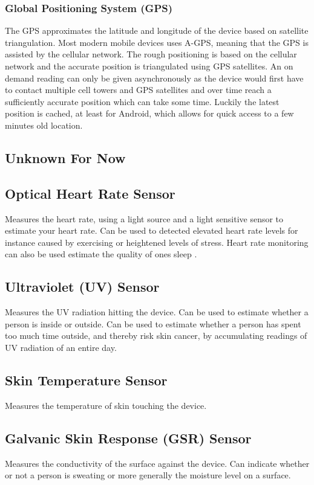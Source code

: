 \subsubsection{Global Positioning System (GPS)}
\label{sub:gps}
The GPS approximates the latitude and longitude of the device based on satellite triangulation. Most modern mobile devices uses A-GPS, meaning that the GPS is assisted by the cellular network. The rough positioning is based on the cellular network and the accurate position is triangulated using GPS satellites. An on demand reading can only be given asynchronously as the device would first have to contact multiple cell towers and GPS satellites and over time reach a sufficiently accurate position which can take some time. Luckily the latest position is cached, at least for Android, which allows for quick access to a few minutes old location. 

\subsection{Unknown For Now}
\label{sub:unknown_for_now}

\subsection{Optical Heart Rate Sensor}
\label{sub:optical_heart_rate_sensor}
Measures the heart rate, using a light source and a light sensitive sensor to estimate your heart rate. Can be used to detected elevated heart rate levels for instance caused by exercising or heightened levels of stress. Heart rate monitoring can also be used estimate the quality of ones sleep \parencite{guardian_fitness_tracker_rem_sleep}. 

\subsection{Ultraviolet (UV) Sensor}
\label{sub:uv_sensor}
Measures the UV radiation hitting the device. Can be used to estimate whether a person is inside or outside. Can be used to estimate whether a person has spent too much time outside, and thereby risk skin cancer, by accumulating readings of UV radiation of an entire day.   

\subsection{Skin Temperature Sensor}
\label{sub:skin_temperature_sensor}
Measures the temperature of skin touching the device.  

\subsection{Galvanic Skin Response (GSR) Sensor}
\label{sub:galvanic_skin_respons_sensor}
Measures the conductivity of the surface against the device. Can indicate whether or not a person is sweating or more generally the moisture level on a surface. 

